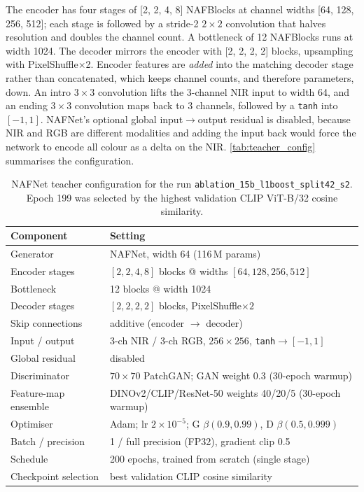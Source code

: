 The encoder has four stages of [2, 2, 4, 8] NAFBlocks at channel widths [64, 128, 256, 512]; each stage is followed by a stride-2 $2{\times}2$ convolution that halves resolution and doubles the channel count. A bottleneck of 12 NAFBlocks runs at width 1024. The decoder mirrors the encoder with [2, 2, 2, 2] blocks, upsampling with PixelShuffle$\times$2. Encoder features are \emph{added} into the matching decoder stage rather than concatenated, which keeps channel counts, and therefore parameters, down. An intro $3{\times}3$ convolution lifts the 3-channel NIR input to width 64, and an ending $3{\times}3$ convolution maps back to 3 channels, followed by a \texttt{tanh} into $[-1,1]$. NAFNet's optional global input$\rightarrow$output residual is disabled, because NIR and RGB are different modalities and adding the input back would force the network to encode all colour as a delta on the NIR. \autoref{tab:teacher_config} summarises the configuration.

\begin{table}[!htbp]
\centering
\footnotesize
\begin{tabular}{ll}
\hline
\textbf{Component} & \textbf{Setting} \\
\hline
Generator & NAFNet, width 64 (116\,M params) \\
Encoder stages & $[2,2,4,8]$ blocks @ widths $[64,128,256,512]$ \\
Bottleneck & 12 blocks @ width 1024 \\
Decoder stages & $[2,2,2,2]$ blocks, PixelShuffle$\times2$ \\
Skip connections & additive (encoder $\to$ decoder) \\
Input / output & 3-ch NIR / 3-ch RGB, $256\times256$, \texttt{tanh}$\to[-1,1]$ \\
Global residual & disabled \\
Discriminator & $70\times70$ PatchGAN; GAN weight 0.3 (30-epoch warmup) \\
Feature-map ensemble & DINOv2/CLIP/ResNet-50 weights 40/20/5 (30-epoch warmup) \\
Optimiser & Adam; lr $2\times10^{-5}$; G $\beta(0.9,0.99)$, D $\beta(0.5,0.999)$ \\
Batch / precision & 1 / full precision (FP32), gradient clip 0.5 \\
Schedule & 200 epochs, trained from scratch (single stage) \\
Checkpoint selection & best validation CLIP cosine similarity \\
\hline
\end{tabular}
\caption{NAFNet teacher configuration for the run \texttt{ablation\_15b\_l1boost\_split42\_s2}. Epoch 199 was selected by the highest validation CLIP ViT-B/32 cosine similarity.}
\label{tab:teacher_config}
\end{table}

